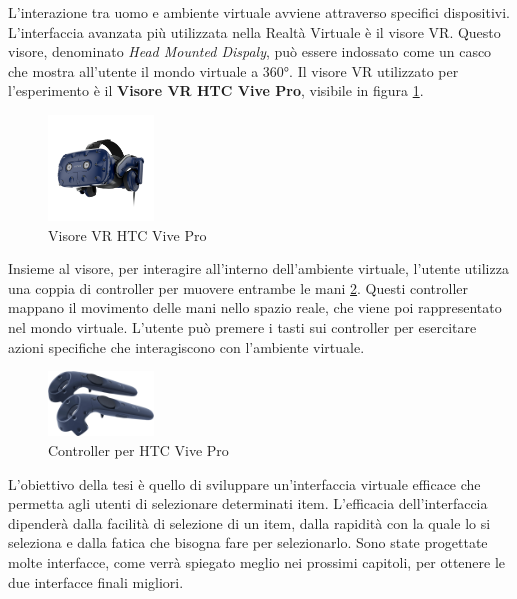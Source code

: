 \documentclass[target=bach,aauheader=]{thud}
\begin{document}
L'interazione tra uomo e ambiente virtuale avviene attraverso specifici dispositivi.
L'interfaccia avanzata più utilizzata nella Realtà Virtuale è il visore VR. 
Questo visore, denominato \textit{Head Mounted Dispaly}, può essere indossato come un casco che mostra all'utente il mondo virtuale a 360°.
Il visore VR utilizzato per l'esperimento è il \textbf{Visore VR HTC Vive Pro}, visibile in figura \ref{fig:vive_pro}.

\begin{figure}[h]
    \centering
    \includegraphics[width=0.25\textwidth]{vive_pro}
    \caption{Visore VR HTC Vive Pro}
    \label{fig:vive_pro}
\end{figure}

Insieme al visore, per interagire all'interno dell'ambiente virtuale, l'utente utilizza una coppia di controller per muovere entrambe le mani \ref{fig:vive_contr}.
Questi controller mappano il movimento delle mani nello spazio reale, che viene poi rappresentato nel mondo virtuale. 
L'utente può premere i tasti sui controller per esercitare azioni specifiche che interagiscono con l'ambiente virtuale. \\

\begin{figure}[h]
    \centering
    \includegraphics[width=0.25\textwidth]{vive_contr}
    \caption{Controller per HTC Vive Pro}
    \label{fig:vive_contr}
\end{figure}

\newpage
L'obiettivo della tesi è quello di sviluppare un'interfaccia virtuale efficace che permetta agli utenti di selezionare determinati item.
L'efficacia dell'interfaccia dipenderà dalla facilità di selezione di un item, dalla rapidità con la quale lo si seleziona e dalla fatica che bisogna fare per selezionarlo.
Sono state progettate molte interfacce, come verrà spiegato meglio nei prossimi capitoli, per ottenere le due interfacce finali migliori. \\
\end{document}
